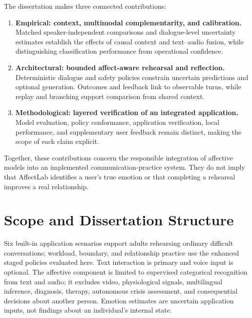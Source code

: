 The dissertation makes three connected contributions:

\begin{enumerate}[itemsep=0.2em, topsep=0.4em, parsep=0pt]
    \item \textbf{Empirical: context, multimodal complementarity, and calibration.} Matched speaker-independent comparisons and dialogue-level uncertainty estimates establish the effects of causal context and text--audio fusion, while distinguishing classification performance from operational confidence.

    \item \textbf{Architectural: bounded affect-aware rehearsal and reflection.} Deterministic dialogue and safety policies constrain uncertain predictions and optional generation. Outcomes and feedback link to observable turns, while replay and branching support comparison from shared context.

    \item \textbf{Methodological: layered verification of an integrated application.} Model evaluation, policy conformance, application verification, local performance, and supplementary user feedback remain distinct, making the scope of each claim explicit.
\end{enumerate}

Together, these contributions concern the responsible integration of affective models into an implemented communication-practice system. They do not imply that AffectLab identifies a user's true emotion or that completing a rehearsal improves a real relationship.

\section{Scope and Dissertation Structure}
\label{sec:scope-limitations}
\label{sec:dissertation-structure}

Six built-in application scenarios support adults rehearsing ordinary difficult conversations; workload, boundary, and relationship practice use the enhanced staged policies evaluated here. Text interaction is primary and voice input is optional. The affective component is limited to supervised categorical recognition from text and audio; it excludes video, physiological signals, multilingual inference, diagnosis, therapy, autonomous crisis assessment, and consequential decisions about another person. Emotion estimates are uncertain application inputs, not findings about an individual's internal state.

